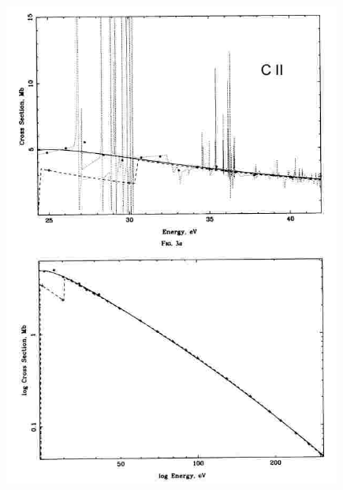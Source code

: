 \begin{minipage}[t]{13cm}
  \begin{center}
    \includegraphics[width=12.5cm,height=16cm]{cii_photion.jpg}
  \end{center}
\end{minipage}


